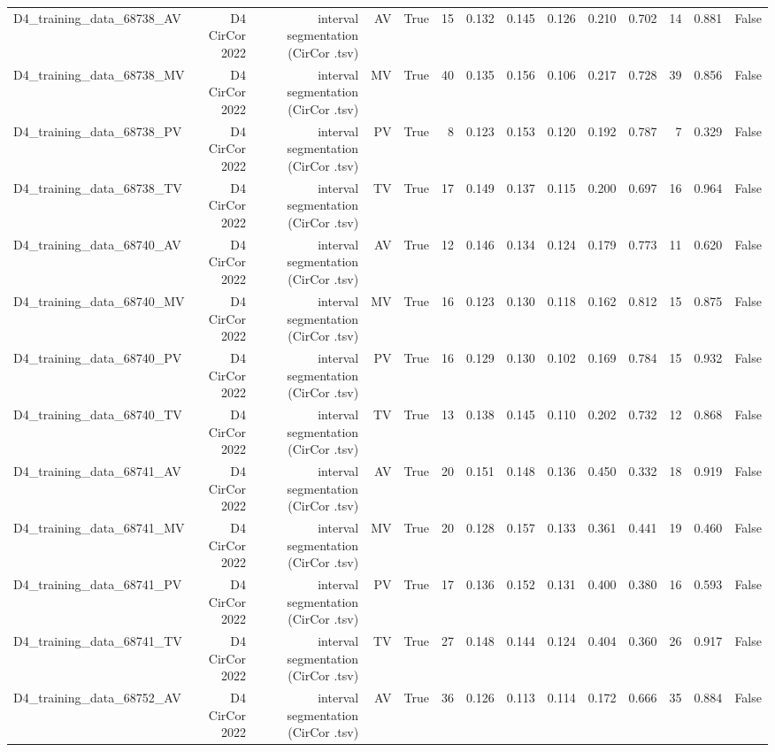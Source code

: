 \begin{table}[htbp]
\begin{tabular}{lrrrrrrrrrrrrr}
    D4\_training\_data\_68738\_AV & D4 CirCor 2022 & interval segmentation (CirCor .tsv) & AV & True & 15 & 0.132 & 0.145 & 0.126 & 0.210 & 0.702 & 14 & 0.881 & False \\
    D4\_training\_data\_68738\_MV & D4 CirCor 2022 & interval segmentation (CirCor .tsv) & MV & True & 40 & 0.135 & 0.156 & 0.106 & 0.217 & 0.728 & 39 & 0.856 & False \\
    D4\_training\_data\_68738\_PV & D4 CirCor 2022 & interval segmentation (CirCor .tsv) & PV & True & 8 & 0.123 & 0.153 & 0.120 & 0.192 & 0.787 & 7 & 0.329 & False \\
    D4\_training\_data\_68738\_TV & D4 CirCor 2022 & interval segmentation (CirCor .tsv) & TV & True & 17 & 0.149 & 0.137 & 0.115 & 0.200 & 0.697 & 16 & 0.964 & False \\
    D4\_training\_data\_68740\_AV & D4 CirCor 2022 & interval segmentation (CirCor .tsv) & AV & True & 12 & 0.146 & 0.134 & 0.124 & 0.179 & 0.773 & 11 & 0.620 & False \\
    D4\_training\_data\_68740\_MV & D4 CirCor 2022 & interval segmentation (CirCor .tsv) & MV & True & 16 & 0.123 & 0.130 & 0.118 & 0.162 & 0.812 & 15 & 0.875 & False \\
    D4\_training\_data\_68740\_PV & D4 CirCor 2022 & interval segmentation (CirCor .tsv) & PV & True & 16 & 0.129 & 0.130 & 0.102 & 0.169 & 0.784 & 15 & 0.932 & False \\
    D4\_training\_data\_68740\_TV & D4 CirCor 2022 & interval segmentation (CirCor .tsv) & TV & True & 13 & 0.138 & 0.145 & 0.110 & 0.202 & 0.732 & 12 & 0.868 & False \\
    D4\_training\_data\_68741\_AV & D4 CirCor 2022 & interval segmentation (CirCor .tsv) & AV & True & 20 & 0.151 & 0.148 & 0.136 & 0.450 & 0.332 & 18 & 0.919 & False \\
    D4\_training\_data\_68741\_MV & D4 CirCor 2022 & interval segmentation (CirCor .tsv) & MV & True & 20 & 0.128 & 0.157 & 0.133 & 0.361 & 0.441 & 19 & 0.460 & False \\
    D4\_training\_data\_68741\_PV & D4 CirCor 2022 & interval segmentation (CirCor .tsv) & PV & True & 17 & 0.136 & 0.152 & 0.131 & 0.400 & 0.380 & 16 & 0.593 & False \\
    D4\_training\_data\_68741\_TV & D4 CirCor 2022 & interval segmentation (CirCor .tsv) & TV & True & 27 & 0.148 & 0.144 & 0.124 & 0.404 & 0.360 & 26 & 0.917 & False \\
    D4\_training\_data\_68752\_AV & D4 CirCor 2022 & interval segmentation (CirCor .tsv) & AV & True & 36 & 0.126 & 0.113 & 0.114 & 0.172 & 0.666 & 35 & 0.884 & False \\

\end{tabular}
\end{table}
